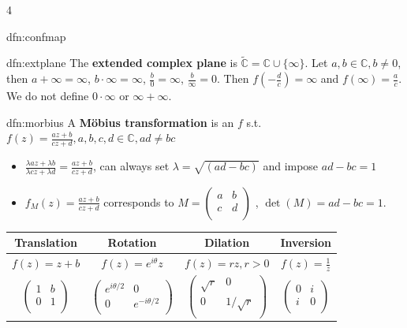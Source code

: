 \documentclass[landscape, 8pt]{extarticle}
\begin{document}
\begin{multicols*}{4}
\begin{dfn}{dfn:confmap}{ }
	\end{dfn}
	
	
	\begin{dfn}{dfn:extplane}{ }
		The \textbf{extended complex plane} is $\tilde{\mathbb{C}} = \mathbb{C} \cup \{\infty\}$. Let $a, b \in \mathbb{C}, b \ne 0$, then $a + \infty = \infty$, $b \cdot \infty = \infty$, $\frac{b}{0} = \infty$, $\frac{b}{\infty} = 0$.	Then $f(-\frac{d}{c}) = \infty$ and $f(\infty) = \frac{a}{c}$. We do not define $0 \cdot \infty$ or $\infty + \infty$.
		
	\end{dfn}
	
	
	\begin{dfn}{dfn:morbius}{ }
		A \textbf{M{\"o}bius transformation} is an $f$ s.t. $f(z) = \frac{az + b}{cz + d}, a, b, c, d \in \mathbb{C}, ad \ne bc$
		\begin{itemize}
			\item $\frac{\lambda az + \lambda b}{\lambda cz + \lambda d} = \frac{az + b}{cz + d}$, can always set $ \lambda = \sqrt{(ad - bc)}$ and impose $ad - bc = 1$
			\item $f_M(z) = \frac{az + b}{cz + d}$ corresponds to $M = 
			\begin{pmatrix}
				a&b\\
				c&d\\
			\end{pmatrix}$ 
			, $\det(M) = ad - bc = 1$.
			
		\end{itemize}
			
			\begin{tabular}{|c|c|c|c|}
				\hline 
				\textbf{Translation} & \textbf{Rotation} & \textbf{Dilation} & \textbf{Inversion} \\ 
				\hline
				$f(z) = z+b$ & $f(z) = e^{i\theta}z$ & $f(z) = rz, r> 0$ & $f(z) = \frac{1}{z}$ \\ 
				\hline
				$\begin{pmatrix}
					1&b\\
					0&1\\
				\end{pmatrix}$
				&
				$\begin{pmatrix}
					e^{i\theta/2}&0\\
					0&e^{-i\theta/2}\\
				\end{pmatrix}$
				&
				$\begin{pmatrix}
					\sqrt{r}&0\\
					0&1/\sqrt{r}\\
				\end{pmatrix}$
				&
				$\begin{pmatrix}
					0&i\\
					i&0\\
				\end{pmatrix}$
				\\
				\hline
				

\end{tabular}
\end{dfn}
\end{multicols*}
\end{document}
